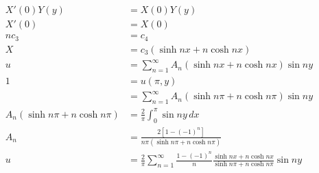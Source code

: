 \documentclass{article}
\begin{document}
\begin{align*}
  X'(0) Y(y)                        & = X(0) Y(y)                                                                                                                   \\
  X'(0)                             & = X(0)                                                                                                                        \\
  n c_3                             & = c_4                                                                                                                         \\
  X                                 & = c_3 (\sinh n x + n \cosh n x)                                                                                               \\
  u                                 & = \sum_{n = 1}^\infty A_n (\sinh n x + n \cosh n x) \sin n y                                                                  \\
  1                                 & = u(\pi, y)                                                                                                                   \\
                                    & = \sum_{n = 1}^\infty A_n (\sinh n \pi + n \cosh n \pi) \sin n y                                                              \\
  A_n (\sinh n \pi + n \cosh n \pi) & = \frac{2}{\pi} \int_0^\pi \sin n y \,d x                                                                                     \\
  A_n                               & = \frac{2 [1 - (-1)^n]}{n \pi (\sinh n \pi + n \cosh n \pi)}                                                                  \\
  u                                 & = \frac{2}{\pi} \sum_{n = 1}^\infty \frac{1 - (-1)^n}{n} \frac{\sinh n x + n \cosh n x}{\sinh n \pi + n \cosh n \pi} \sin n y
\end{align*}

\setcounter{subsubsection}{10}
\subsubsection{}
\end{document}
